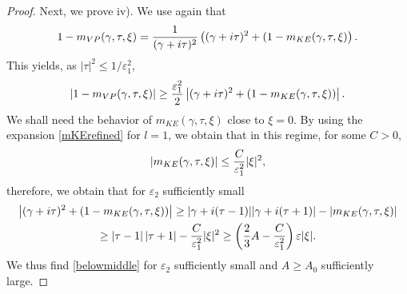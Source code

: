 \documentclass[11pt]{amsart}
\numberwithin{equation}{section}
\newcommand{\R}{\mathbb{R}}
\newtheorem{lem}{Lemma}[section]
\newcommand{\eps}{\varepsilon}
\begin{document}
\begin{proof}
Next, we prove  iv). We use again that 
\begin{equation}
\label{impl1} 1-m_{VP}(\gamma,\tau,\xi)=   { 1 \over (\gamma + i \tau )^2} \left( ( \gamma + i\tau)^2  +  (1 - m_{KE}(\gamma, \tau, \xi)\right).
\end{equation}
This yields, as $|\tau|^2 \leq 1/\eps_1^2$,
$$  \left | 1-m_{VP}(\gamma,\tau,\xi) \right| \geq  { \eps_{1}^2 \over 2} \left|  ( \gamma + i\tau)^2  +  (1 - m_{KE}(\gamma, \tau, \xi) )\right|.
$$
We shall need the behavior  of  $m_{KE}(\gamma, \tau, \xi)$ close to $\xi=0$. %
By using the expansion \eqref{mKErefined} for $l=1$, we obtain that  
 in this regime,   for some $C>0$,
$$ |m_{KE}(\gamma, \tau, \xi)| \leq { C \over  \eps_{1}^2} | \xi |^2, $$
therefore, we obtain that for $\eps_{2}$ sufficiently small
 \begin{multline}
 \label{bof} \left|  ( \gamma + i\tau)^2  +  (1 - m_{KE}(\gamma, \tau, \xi) )\right| \geq
  | \gamma + i( \tau -1) | | \gamma + i(\tau + 1) | - | m_{KE}(\gamma, \tau, \xi) |
   \\ \geq  | \tau - 1 | \, |\tau + 1 | - { C \over \eps_{1}^2} | \xi |^2 
    \geq   \left( \frac{2}{3}  A - {C \over \eps_{1}^2 } \right) \eps | \xi|.
 \end{multline}
We thus find \eqref{belowmiddle} for $\eps_{2}$ sufficiently small and $A\geq A_{0}$ sufficiently large.


\end{proof}
\end{document}
